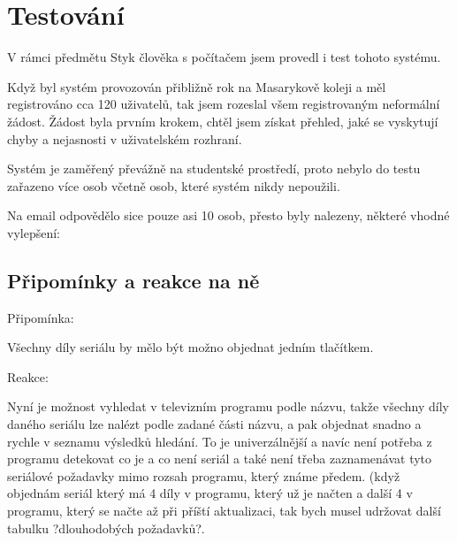 
\chapter{Testování}

V rámci předmětu Styk člověka s počítačem jsem provedl i test tohoto systému.

\vspace{10pt}

Když byl systém provozován přibližně rok na Masarykově koleji a měl registrováno cca 120 uživatelů, tak jsem rozeslal všem registrovaným neformální žádost. Žádost byla prvním krokem, chtěl jsem získat přehled, jaké se vyskytují chyby a nejasnosti v uživatelském rozhraní. 

\vspace{10pt}

Systém je zaměřený převážně na studentské prostředí, proto nebylo do testu zařazeno více osob včetně osob, které systém nikdy nepoužili.

\vspace{10pt}

Na email odpovědělo sice pouze asi 10 osob, přesto byly nalezeny, některé vhodné vylepšení:

\vspace{10pt}

\section{Připomínky a reakce na ně}

\begin{bf}Připomínka:\end{bf} Všechny díly seriálu by mělo být možno objednat jedním tlačítkem.

\begin{bf}Reakce:\end{bf} Nyní je možnost vyhledat v televizním programu podle názvu, takže všechny díly daného seriálu lze nalézt podle zadané části názvu, a pak objednat snadno a rychle v seznamu výsledků hledání. To je univerzálnější a navíc není potřeba z programu detekovat co je a co není seriál a také není třeba zaznamenávat tyto seriálové požadavky mimo rozsah programu, který známe předem. (když objednám seriál který má 4 díly v programu, který už je načten a další 4 v programu, který se načte až při příští aktualizaci, tak bych musel udržovat další tabulku ?dlouhodobých požadavků?.

\vspace{10pt}
 
